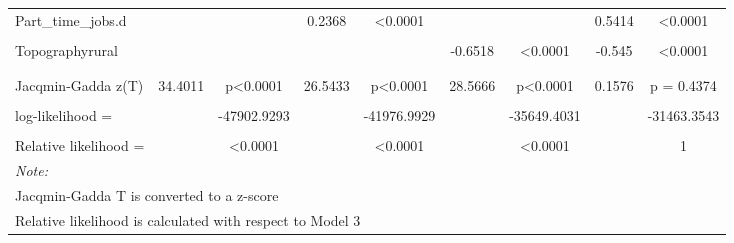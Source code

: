 \documentclass[smallextended]{svjour3}       %
\begin{document}
\begin{landscape}
\begin{table}
{\begin{tabular}[t]{lcccccccc}
Part\_time\_jobs.d &  &  & 0.2368 & <0.0001 &  &  & 0.5414 & <0.0001\\
\cellcolor{gray!6}{Topographylower city - rural} & \cellcolor{gray!6}{} & \cellcolor{gray!6}{} & \cellcolor{gray!6}{} & \cellcolor{gray!6}{} & \cellcolor{gray!6}{-2.53} & \cellcolor{gray!6}{<0.0001} & \cellcolor{gray!6}{-2.4021} & \cellcolor{gray!6}{<0.0001}\\
Topographyrural &  &  &  &  & -0.6518 & <0.0001 & -0.545 & <0.0001\\
\cellcolor{gray!6}{quietest\_distance} & \cellcolor{gray!6}{} & \cellcolor{gray!6}{} & \cellcolor{gray!6}{} & \cellcolor{gray!6}{} & \cellcolor{gray!6}{-0.3253} & \cellcolor{gray!6}{<0.0001} & \cellcolor{gray!6}{-0.345} & \cellcolor{gray!6}{<0.0001}\\
\addlinespace[2em]
\multicolumn{9}{l}{\textbf{Model diagnostics}}\\
\hspace{1em}Jacqmin-Gadda z(T) & 34.4011 & p<0.0001 & 26.5433 & p<0.0001 & 28.5666 & p<0.0001 & 0.1576 & p =  0.4374\\
\hspace{1em}\cellcolor{gray!6}{n =} & \cellcolor{gray!6}{} & \cellcolor{gray!6}{9801} & \cellcolor{gray!6}{} & \cellcolor{gray!6}{9801} & \cellcolor{gray!6}{} & \cellcolor{gray!6}{9801} & \cellcolor{gray!6}{} & \cellcolor{gray!6}{9801}\\
\hspace{1em}log-likelihood = &  & -47902.9293 &  & -41976.9929 &  & -35649.4031 &  & -31463.3543\\
\hspace{1em}\cellcolor{gray!6}{AIC =} & \cellcolor{gray!6}{} & \cellcolor{gray!6}{95807.8587} & \cellcolor{gray!6}{} & \cellcolor{gray!6}{83993.9858} & \cellcolor{gray!6}{} & \cellcolor{gray!6}{71306.8063} & \cellcolor{gray!6}{} & \cellcolor{gray!6}{62972.7087}\\
\hspace{1em}Relative likelihood = &  & <0.0001 &  & <0.0001 &  & <0.0001 &  & 1\\
\bottomrule
\multicolumn{9}{l}{\rule{0pt}{1em}\textit{Note: }}\\
\multicolumn{9}{l}{\rule{0pt}{1em}Jacqmin-Gadda T is converted to a z-score}\\
\multicolumn{9}{l}{\rule{0pt}{1em}Relative likelihood is calculated with respect to Model 3}\\
\end{tabular}}
\end{table}
\end{landscape}
\end{document}
